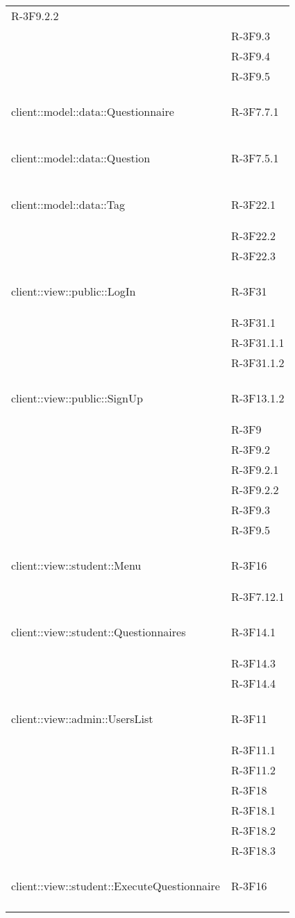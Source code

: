 \begin{longtable}{l p{3cm}}
R-3F9.2.2 \tabularnewline &

R-3F9.3 \tabularnewline &

R-3F9.4 \tabularnewline &

R-3F9.5 \tabularnewline &\tabularnewline
\midrule
\hypertarget{client::model::data::Questionnaire}{client::model::data::Questionnaire} & R-3F7.7.1 \tabularnewline &\tabularnewline
\midrule
\hypertarget{client::model::data::Question}{client::model::data::Question} & R-3F7.5.1 \tabularnewline &\tabularnewline
\midrule
\hypertarget{client::model::data::Tag}{client::model::data::Tag} & R-3F22.1 \tabularnewline &

R-3F22.2 \tabularnewline &

R-3F22.3 \tabularnewline &\tabularnewline
\midrule
\hypertarget{client::view::public::LogIn}{client::view::public::LogIn} & R-3F31 \tabularnewline &

R-3F31.1 \tabularnewline &

R-3F31.1.1 \tabularnewline &

R-3F31.1.2 \tabularnewline &\tabularnewline
\midrule
\hypertarget{client::view::public::SignUp}{client::view::public::SignUp} & R-3F13.1.2 \tabularnewline &

R-3F9 \tabularnewline &

R-3F9.2 \tabularnewline &

R-3F9.2.1 \tabularnewline &

R-3F9.2.2 \tabularnewline &

R-3F9.3 \tabularnewline &

R-3F9.5 \tabularnewline &\tabularnewline
\midrule
\hypertarget{client::view::student::Menu}{client::view::student::Menu} & R-3F16 \tabularnewline &

R-3F7.12.1 \tabularnewline &\tabularnewline
\midrule
\hypertarget{client::view::student::Questionnaires}{client::view::student::Questionnaires} & R-3F14.1 \tabularnewline &

R-3F14.3 \tabularnewline &

R-3F14.4 \tabularnewline &\tabularnewline
\midrule
\hypertarget{client::view::admin::UsersList}{client::view::admin::UsersList} & R-3F11 \tabularnewline &

R-3F11.1 \tabularnewline &

R-3F11.2 \tabularnewline &

R-3F18 \tabularnewline &

R-3F18.1 \tabularnewline &

R-3F18.2 \tabularnewline &

R-3F18.3 \tabularnewline &\tabularnewline
\midrule
\hypertarget{client::view::student::ExecuteQuestionnaire}{client::view::student::ExecuteQuestionnaire} & R-3F16 \tabularnewline &


\end{longtable}
